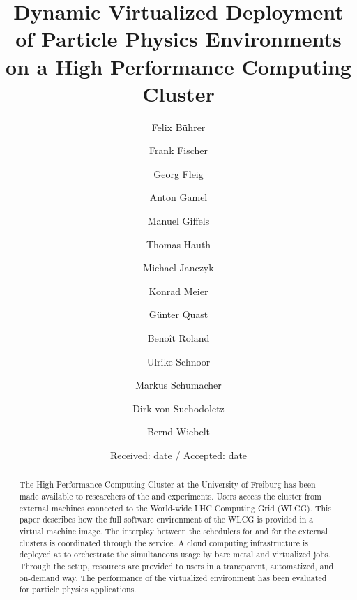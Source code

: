 %


\title{Dynamic Virtualized Deployment of Particle Physics Environments on a
  High Performance Computing Cluster}
%
\author{Felix B\"uhrer \and Frank Fischer \and Georg Fleig \and Anton
  Gamel \and Manuel Giffels \and Thomas Hauth \and Michael Janczyk
  \and Konrad Meier \and
G\"unter Quast \and  Beno\^it Roland  \and Ulrike Schnoor \and
  Markus Schumacher \and Dirk von Suchodoletz \and Bernd Wiebelt
}






\date{Received: date / Accepted: date}


\maketitle

\begin{abstract}
The \NEMO High Performance Computing Cluster at the University of
Frei\-burg has been made available to
researchers of the \ATLAS and \CMS experiments.
Users access the cluster from external machines connected to the
World-wide LHC Computing Grid (WLCG).
 This paper describes how the full software environment of the WLCG
 is provided in a virtual machine image. The interplay between the
 schedulers for \NEMO and for the external
 clusters is coordinated through the \Roced service.
A cloud computing infrastructure is deployed at \NEMO to orchestrate the
simultaneous usage by bare metal and virtualized jobs.
Through the setup, resources are provided to users in a transparent,
automatized, and
on-demand way. The performance of the virtualized environment has been
evaluated for particle physics applications.



\end{abstract}




